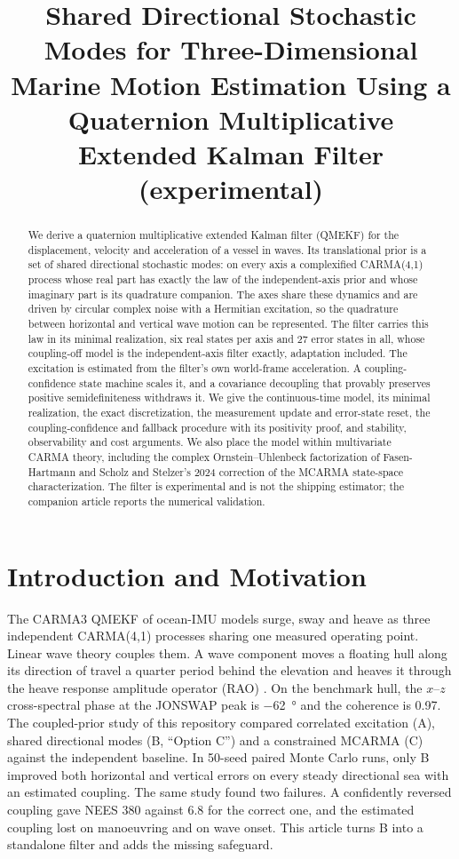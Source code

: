\documentclass[conference]{IEEEtran}
\title{Shared Directional Stochastic Modes for Three-Dimensional Marine
Motion Estimation Using a Quaternion Multiplicative Extended Kalman Filter
(experimental)}
\author{%
  \IEEEauthorblockN{Mikhail S. Grushinskiy}
  \IEEEauthorblockA{Independent Researcher, USA, Fair Lawn\\
  Bareboat Necessities GitHub Project\\
  Email: mgrouch@users.github.com}%
}
\theoremstyle{bodysmall}
\begin{document}
\maketitle

\begin{abstract}
We derive a quaternion multiplicative extended Kalman filter (QMEKF) for
the displacement, velocity and acceleration of a vessel in waves. Its
translational prior is a set of shared directional stochastic modes: on
every axis a complexified CARMA(4,1) process whose real part has exactly the
law of the independent-axis prior and whose imaginary part is its quadrature
companion. The axes share these dynamics and are driven by circular complex
noise with a Hermitian excitation, so the quadrature between horizontal and
vertical wave motion can be represented. The filter carries this law in its
minimal realization, six real states per axis and 27 error states in all,
whose coupling-off model is the independent-axis filter exactly, adaptation
included. The excitation is estimated from
the filter's own world-frame acceleration. A coupling-confidence state
machine scales it, and a covariance decoupling that provably preserves
positive semidefiniteness withdraws it. We give the continuous-time model,
its minimal realization, the exact discretization, the measurement update and error-state reset, the
coupling-confidence and fallback procedure with its positivity proof, and
stability, observability and cost arguments. We also place the model within
multivariate CARMA theory, including the complex Ornstein--Uhlenbeck
factorization of Fasen-Hartmann and Scholz and Stelzer's 2024 correction of
the MCARMA state-space characterization. The filter is experimental and is
not the shipping estimator; the companion article reports the numerical
validation.
\end{abstract}

\section{Introduction and Motivation}
The CARMA3 QMEKF of ocean-IMU models surge, sway and heave as three
independent CARMA(4,1) processes sharing one measured operating point. Linear
wave theory couples them. A wave component moves a floating hull along its
direction of travel a quarter period behind the elevation and heaves it
through the heave response amplitude operator (RAO)
\cite{longuethiggins63,faltinsen90,fossen11}. On the benchmark hull, the
$x$--$z$ cross-spectral phase at the JONSWAP peak is \SI{-62}{\degree} and
the coherence is 0.97. The coupled-prior study of this repository compared
correlated excitation (A), shared directional modes (B, ``Option C'') and a
constrained MCARMA (C) against the independent baseline. In 50-seed paired
Monte Carlo runs, only B improved both horizontal and vertical errors on
every steady directional sea with an estimated coupling. The same study
found two failures. A confidently reversed coupling gave NEES 380 against
6.8 for the correct one, and the estimated coupling lost on manoeuvring and
on wave onset. This article turns B into a standalone filter and adds the
missing safeguard.
\end{document}

